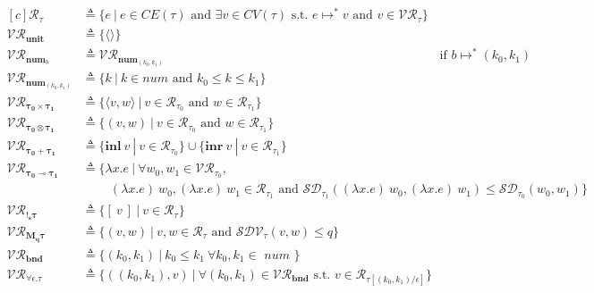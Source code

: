 \begin{definition}
  \begin{equation}
  \begin{aligned}[c]
    \mathcal{R_{\tau}} &\triangleq 
      \{ e \ | \ e \in CE(\tau) \text{ and } \exists v
        \in CV(\tau) \text{ s.t. } e \mapsto^{*} v \text{ and } v \in \mathcal{VR_{\tau}} 
      \} \\
    \mathcal{VR_{\mathbf{unit}}} &\triangleq \{ \langle \rangle \} \\
    \mathcal{VR}_{\mathbf{num}_{b}} &\triangleq 
      \mathcal{VR}_{\mathbf{num}_{(k_0, k_1)}} 
      \hspace{22em} \text{if } b \mapsto^* (k_0, k_1) \\
    \mathcal{VR}_{\mathbf{num}_{(k_0, k_1)}} &\triangleq 
      \{ k \ | \ k \in \mathit{num} \text{ and } k_0 \leq k \leq k_1 \} \\
    \mathcal{VR_{\mathbf{\tau_0 \times \tau_1}}} &\triangleq 
      \{ \langle v, w \rangle \ | 
        \ v \in \mathcal{R}_{\tau_0} \text{ and } w \in \mathcal{R}_{\tau_1}
      \} \\
    \mathcal{VR_{\mathbf{\tau_0 \otimes \tau_1}}} &\triangleq 
      \{ ( v, w ) \ | 
        \ v \in \mathcal{R}_{\tau_0} \text{ and } w \in \mathcal{R}_{\tau_1}
      \} \\
    \mathcal{VR_{\mathbf{\tau_0 + \tau_1}}} &\triangleq 
      \{ \mathbf{inl}~v \ | \ v \in \mathcal{R}_{\tau_0} \} 
      \cup
      \{ \mathbf{inr}~v \ | \ v \in \mathcal{R}_{\tau_1} \} \\
    \mathcal{VR_{\mathbf{\tau_0 \multimap \tau_1}}} &\triangleq 
      \{ \lambda x . e \ | \ \forall w_0, w_1 \in \mathcal{VR}_{\tau_0}, \\ & \quad \quad \ (\lambda x.e)~w_0, (\lambda x . e)~w_1 \in
      \mathcal{R}_{\tau_1} \text{ and } \mathcal{SD}_{\tau_1}((\lambda x . e)~w_0, (\lambda x . e)~w_1) \leq
      \mathcal{SD}_{\tau_0}(w_0, w_1) \} \\
    \mathcal{VR_{\mathbf{!_s \tau}}} &\triangleq 
      \{ [~v~] \ | \ v \in \mathcal{R}_{\tau} \} \\
    \mathcal{VR_{\mathbf{M_q \tau}}} &\triangleq 
      \{ (v, w) \ | \ v, w \in \mathcal{R}_{\tau} \text{ and } \mathcal{SDV}_{\tau}(v, w)
      \leq q \} \\
    \mathcal{VR}_{\textbf{bnd}} &\triangleq \{ (k_0, k_1) \ | \ k_0 \leq k_1 \ \forall k_0, k_1 \in
    \textit{ num } \} \\
    \mathcal{VR_{\forall \epsilon. \tau}} &\triangleq 
      \{ ((k_0, k_1), v) \ | \
        \forall (k_0, k_1) \in \mathcal{VR}_{\textbf{bnd}} \text{ s.t. } 
        v \in \mathcal{R}_{\tau[(k_0, k_1) / \epsilon]}\} \\
  \end{aligned}
  \end{equation}
\end{definition}

